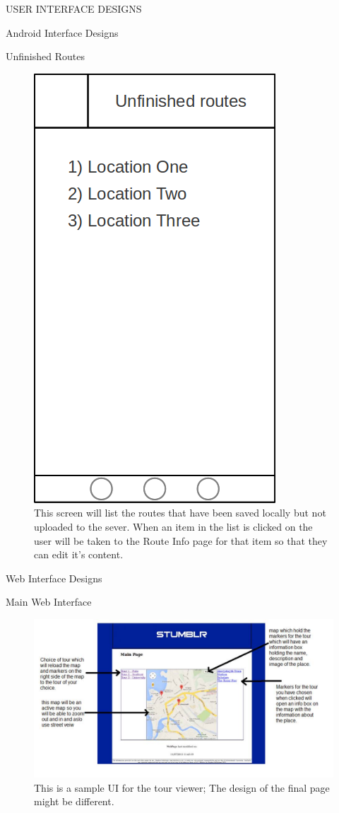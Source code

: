 \documentclass{article}
\begin{document}
\begin{section}{USER INTERFACE DESIGNS}
\begin{subsection}{Android Interface Designs}
			\begin{subsubsection}{Unfinished Routes}
				\begin{figure}[h!]
					\begin{center}
						\includegraphics[height=0.45\columnwidth]{./Diagrams/AndroidUserInterface/source/unfinishedRoutes.png}
					\end{center}
					\caption{This screen will list the routes that have been saved locally but not uploaded to the sever. When an item in the list is clicked on the user will be taken to the Route Info page for that item so that they can edit it's content.}
				\end{figure}
			\end{subsubsection}
		\end{subsection}
		
		\clearpage
		\begin{subsection}{Web Interface Designs}
			\begin{subsubsection}{Main Web Interface}
				\begin{figure}[h!]
					\begin{center}
						\includegraphics[height=0.55\columnwidth]{./Diagrams/WebUserInterface/AnnotatedUI.jpg}
					\end{center}
					\caption{This is a sample UI for the tour viewer;  The design of the final page might be different.}
				\end{figure}
			\end{subsubsection}
		\end{subsection}
	\end{section}
\end{document}
